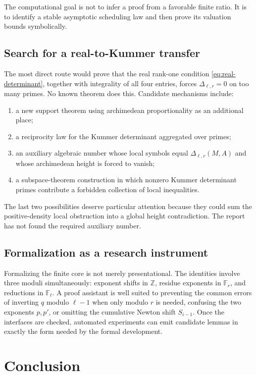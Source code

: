 \documentclass[11pt,oneside]{article}
\theoremstyle{definition}
\theoremstyle{remark}
\newcommand{\Z}{\mathbb Z}
\newcommand{\F}{\mathbb F}
\begin{document}
The computational goal is not to infer a proof from a favorable finite ratio.  It is to
identify a stable asymptotic scheduling law and then prove its valuation bounds symbolically.

\subsection{Search for a real-to-Kummer transfer}

The most direct route would prove that the real rank-one condition
\eqref{eq:real-determinant}, together with integrality of all four entries, forces
$\Delta_{\ell,r}=0$ on too many primes.  No known theorem does this.  Candidate mechanisms
include:
\begin{enumerate}
\item a new support theorem using archimedean proportionality as an additional place;
\item a reciprocity law for the Kummer determinant aggregated over primes;
\item an auxiliary algebraic number whose local symbols equal
      $\Delta_{\ell,r}(M,A)$ and whose archimedean height is forced to vanish;
\item a subspace-theorem construction in which nonzero Kummer determinant primes contribute a
      forbidden collection of local inequalities.
\end{enumerate}
The last two possibilities deserve particular attention because they could sum the
positive-density local obstruction into a global height contradiction.  The report has not
found the required auxiliary number.

\subsection{Formalization as a research instrument}

Formalizing the finite core is not merely presentational.  The identities involve three
moduli simultaneously: exponent shifts in $\Z$, residue exponents in $\F_r$, and reductions
in $\F_\ell$.  A proof assistant is well suited to preventing the common errors of inverting
$q$ modulo $\ell-1$ when only modulo $r$ is needed, confusing the two exponents $p,p'$, or
omitting the cumulative Newton shift $S_{i-1}$.  Once the interfaces are checked, automated
experiments can emit candidate lemmas in exactly the form needed by the formal development.

\section{Conclusion}
\label{sec:conclusion}
\end{document}
